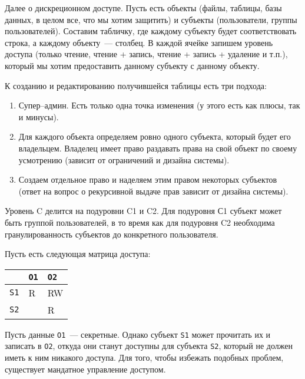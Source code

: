Далее о дискреционном доступе. Пусть есть объекты (файлы, таблицы, базы данных,
в целом все, что мы хотим защитить) и субъекты (пользователи, группы
пользователей). Составим табличку, где каждому субъекту будет соответствовать
строка, а каждому объекту~--- столбец. В каждой ячейке запишем уровень доступа
(только чтение, чтение + запись, чтение + запись + удаление и т.п.), который мы
хотим предоставить данному субъекту с данному объекту.

К созданию и редактированию получившейся таблицы есть три подхода:
\begin{enumerate}
\item
  Супер--админ. Есть только одна точка изменения (у этого есть как плюсы, так и
  минусы).

\item
  Для каждого объекта определяем ровно одного субъекта, который будет его
  владельцем. Владелец имеет право раздавать права на свой объект по своему
  усмотрению (зависит от ограничений и дизайна системы).

\item
  Создаем отдельное право  и наделяем этим правом некоторых
  субъектов (ответ на вопрос о рекурсивной выдаче прав зависит от дизайна
  системы).
\end{enumerate}

\begin{remark}
  Уровень C делится на подуровни C1 и C2. Для подуровня С1 субъект может быть
  группой пользователей, в то время как для подуровня C2 необходима
  гранулированность субъектов до конкретного пользователя.
\end{remark}


Пусть есть следующая матрица доступа:
\begin{table}[h!]
  \centering

  \begin{tabularx}{0.3 \textwidth}{ X | X  X }
                & \texttt{O1} & \texttt{O2} \\ \hline
    \texttt{S1} & R           & RW          \\
    \texttt{S2} &             & R           \\
  \end{tabularx}
\end{table}

Пусть данные \texttt{O1}~--- секретные. Однако субъект \texttt{S1} может
прочитать их и записать в \texttt{O2}, откуда они станут доступны для субъекта
\texttt{S2}, который не должен иметь к ним никакого доступа. Для того, чтобы
избежать подобных проблем, существует мандатное управление доступом.

